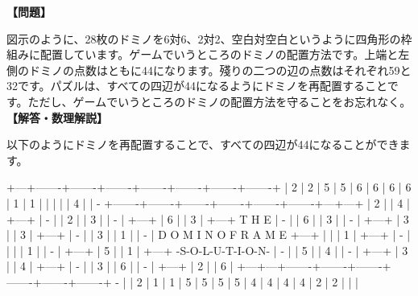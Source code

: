 \documentclass[10pt,a4paper,oneside,openany]{ltjsbook}
\begin{document}
\begin{tcolorbox}[colback=softblue,colframe=primaryblue,title=\textbf{第 380 問：ドミノ枠組みパズル （原題: THE DOMINO FRAME PUZZLE.）},arc=2mm,boxrule=1pt,breakable]
\textbf{【問題】}\par\vspace{0.3em}
図示のように、28枚のドミノを6対6、2対2、空白対空白というように四角形の枠組みに配置しています。ゲームでいうところのドミノの配置方法です。上端と左側のドミノの点数はともに44になります。殘りの二つの辺の点数はそれぞれ59と32です。パズルは、すべての四辺が44になるようにドミノを再配置することです。ただし、ゲームでいうところのドミノの配置方法を守ることをお忘れなく。
\tcblower
\textbf{【解答・数理解説】}\par\vspace{0.3em}
以下のようにドミノを再配置することで、すべての四辺が44になることができます。

    +---+-------+-------+-------+-------+-------+-------+-------+
    | 2 | 2 | 5 | 5 | 6 | 6 | 6 | 6 | 1 | 1 |   |   |   |   | 4 |
    | - +-------+-------+-------+-------+-------+-------+---+---+
    | 2 |                                                   | 4 |
    +---+                                                   | - |
    | 2 |                                                   | 3 |
    | - |                                                   +---+
    | 6 |                                                   | 3 |
    +---+                       T H E                       | - |
    | 6 |                                                   | 3 |
    | - |                                                   +---+
    | 3 |                                                   | 3 |
    +---+                                                   | - |
    | 3 |                                                   | 1 |
    | - |              D O M I N O   F R A M E              +---+
    |   |                                                   | 1 |
    +---+                                                   | - |
    |   |                                                   | 1 |
    | - |                                                   +---+
    | 5 |                                                   | 1 |
    +---+                 -S-O-L-U-T-I-O-N-                 | - |
    | 5 |                                                   | 4 |
    | - |                                                   +---+
    | 3 |                                                   | 4 |
    +---+                                                   | - |
    | 3 |                                                   | 6 |
    | - |                                                   +---+
    | 2 |                                                   | 6 |
    +---+---+-------+-------+-------+-------+-------+-------+ - |
    | 2 | 1 | 1 | 5 | 5 | 5 | 5 | 4 | 4 | 4 | 4 | 2 | 2 |   |   |
\end{tcolorbox}
\end{document}
